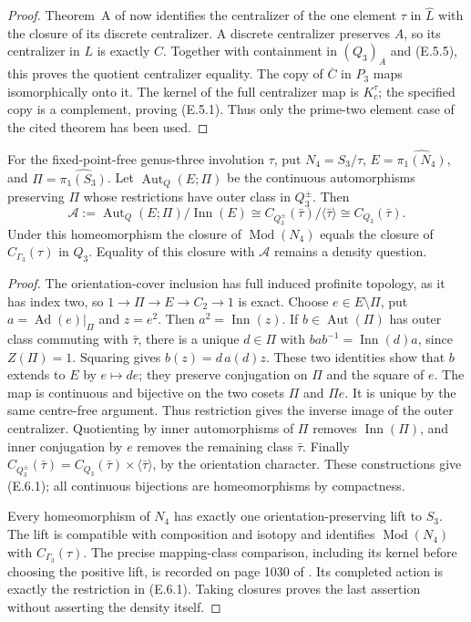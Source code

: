 \begin{proof}
Theorem~A of \cite{CEBoggiZalesskii2025} now identifies the
centralizer of the one element $\tau$ in $\widehat L$ with
the closure of its discrete centralizer.  A discrete
centralizer preserves $A$, so its centralizer in $L$ is
exactly $C$.  Together with containment in $(Q_3)_A$ and
(E.5.5), this proves the quotient centralizer equality.
The copy of $\overline C$ in $P_3$ maps isomorphically onto
it.  The kernel of the full centralizer map is $K_c^\tau$;
the specified copy is a complement, proving (E.5.1).
Thus only the prime-two element case of the cited theorem
has been used.
\end{proof}

For the fixed-point-free genus-three involution $\tau$, put
$N_4=S_3/\tau$, $E=\widehat{\pi_1(N_4)}$, and
$\Pi=\widehat{\pi_1(S_3)}$.  Let $\operatorname{Aut}_{Q}(E;\Pi)$
be the continuous automorphisms preserving $\Pi$ whose
restrictions have outer class in $Q_3^{\pm}$.  Then
\[
 \mathcal A:=\operatorname{Aut}_{Q}(E;\Pi)/\operatorname{Inn}(E)
   \cong C_{Q_3^{\pm}}(\bar\tau)/\langle\bar\tau\rangle
   \cong C_{Q_3}(\bar\tau).                                  \tag{E.6.1}
\]
Under this homeomorphism the closure of
$\operatorname{Mod}(N_4)$ equals the closure of
$C_{\Gamma_3}(\tau)$ in $Q_3$.  Equality of this closure
with $\mathcal A$ remains a density question.

\begin{proof}
The orientation-cover inclusion has full induced profinite
topology, as it has index two, so
$1\to\Pi\to E\to C_2\to1$ is exact.  Choose
$e\in E\setminus\Pi$, put $a=\operatorname{Ad}(e)|_\Pi$
and $z=e^2$.  Then $a^2=\operatorname{Inn}(z)$.  If
$b\in\operatorname{Aut}(\Pi)$ has outer class commuting
with $\bar\tau$, there is a unique $d\in\Pi$ with
$bab^{-1}=\operatorname{Inn}(d)a$, since $Z(\Pi)=1$.
Squaring gives $b(z)=d\,a(d)z$.  These two identities
show that $b$ extends to $E$ by $e\mapsto de$; they
preserve conjugation on $\Pi$ and the square of $e$.
The map is continuous and bijective on the two cosets
$\Pi$ and $\Pi e$.  It is unique by the same centre-free
argument.  Thus restriction gives the inverse image of
the outer centralizer.  Quotienting by inner automorphisms
of $\Pi$ removes $\operatorname{Inn}(\Pi)$, and inner
conjugation by $e$ removes the remaining class $\bar\tau$.
Finally
$C_{Q_3^{\pm}}(\bar\tau)=C_{Q_3}(\bar\tau)\times
\langle\bar\tau\rangle$, by the orientation character.
These constructions give (E.6.1); all continuous bijections
are homeomorphisms by compactness.

Every homeomorphism of $N_4$ has exactly one
orientation-preserving lift to $S_3$.  The lift is compatible
with composition and isotopy and identifies
$\operatorname{Mod}(N_4)$ with $C_{\Gamma_3}(\tau)$.
The precise mapping-class comparison, including its kernel
before choosing the positive lift, is recorded on page 1030
of \cite{CEStukow2016}.  Its completed action is exactly
the restriction in (E.6.1).  Taking closures proves the
last assertion without asserting the density itself.
\end{proof}

